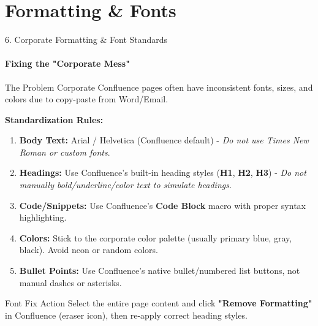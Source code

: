 \documentclass[10pt, aspectratio=169]{beamer}
\begin{document}
	\section{Formatting \& Fonts}
	\begin{frame}{6. Corporate Formatting \& Font Standards}
		\framesubtitle{Fixing the "Corporate Mess"}
		\begin{block}{The Problem}
			Corporate Confluence pages often have inconsistent fonts, sizes, and colors due to copy-paste from Word/Email.
		\end{block}
		
		\pause
		\textbf{Standardization Rules:}
		\begin{enumerate}
			\item \textbf{Body Text:} Arial / Helvetica (Confluence default) - \textit{Do not use Times New Roman or custom fonts}.
			\item \textbf{Headings:} Use Confluence's built-in heading styles (\textbf{H1}, \textbf{H2}, \textbf{H3}) - \textit{Do not manually bold/underline/color text to simulate headings}.
			\item \textbf{Code/Snippets:} Use Confluence's \textbf{Code Block} macro with proper syntax highlighting.
			\item \textbf{Colors:} Stick to the corporate color palette (usually primary blue, gray, black). Avoid neon or random colors.
			\item \textbf{Bullet Points:} Use Confluence's native bullet/numbered list buttons, not manual dashes or asterisks.
		\end{enumerate}
		\pause
		\begin{alertblock}{Font Fix Action}
			Select the entire page content and click \textbf{"Remove Formatting"} in Confluence (eraser icon), then re-apply correct heading styles.
		\end{alertblock}
	\end{frame}
	
\end{document}
